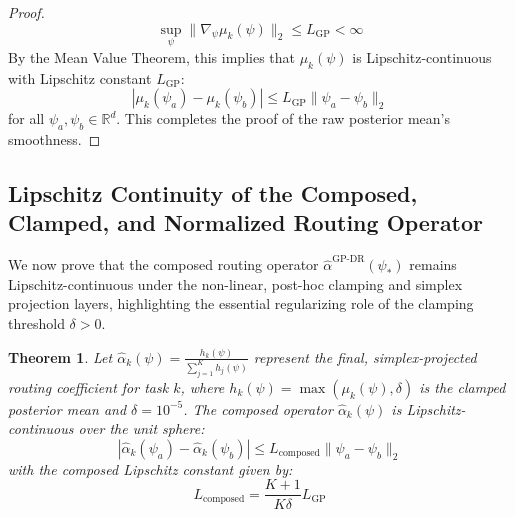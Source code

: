 \documentclass{article}
\theoremstyle{plain}
\newtheorem{theorem}{Theorem}[section]
\theoremstyle{definition}
\theoremstyle{remark}
\begin{document}
\begin{proof}
\begin{equation}
\sup_{\psi} \|\nabla_{\psi} \mu_k(\psi)\|_2 \le L_{\text{GP}} < \infty
\end{equation}
By the Mean Value Theorem, this implies that $\mu_k(\psi)$ is Lipschitz-continuous with Lipschitz constant $L_{\text{GP}}$:
\begin{equation}
|\mu_k(\psi_a) - \mu_k(\psi_b)| \le L_{\text{GP}} \|\psi_a - \psi_b\|_2
\end{equation}
for all $\psi_a, \psi_b \in \mathbb{R}^d$. This completes the proof of the raw posterior mean's smoothness.
\end{proof}

\subsection{Lipschitz Continuity of the Composed, Clamped, and Normalized Routing Operator}
We now prove that the composed routing operator $\hat{\alpha}^{\text{GP-DR}}(\psi_*)$ remains Lipschitz-continuous under the non-linear, post-hoc clamping and simplex projection layers, highlighting the essential regularizing role of the clamping threshold $\delta > 0$.

\begin{theorem}
Let $\hat{\alpha}_k(\psi) = \frac{h_k(\psi)}{\sum_{j=1}^K h_j(\psi)}$ represent the final, simplex-projected routing coefficient for task $k$, where $h_k(\psi) = \max(\mu_k(\psi), \delta)$ is the clamped posterior mean and $\delta = 10^{-5}$. The composed operator $\hat{\alpha}_k(\psi)$ is Lipschitz-continuous over the unit sphere:
\begin{equation}
|\hat{\alpha}_k(\psi_a) - \hat{\alpha}_k(\psi_b)| \le L_{\text{composed}} \|\psi_a - \psi_b\|_2
\end{equation}
with the composed Lipschitz constant given by:
\begin{equation}
L_{\text{composed}} = \frac{K+1}{K \delta} L_{\text{GP}}
\end{equation}
\end{theorem}
\end{document}
